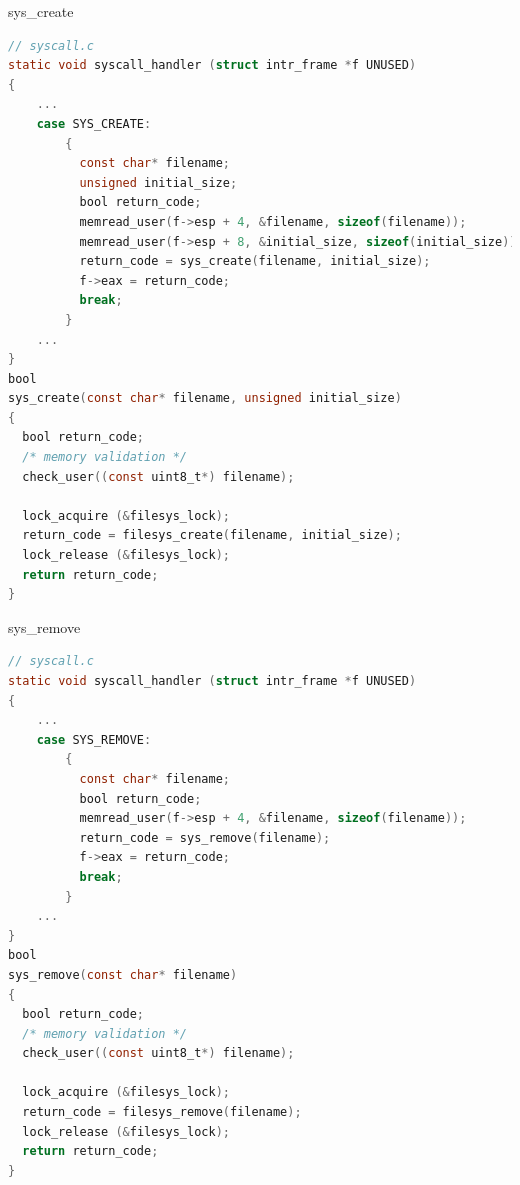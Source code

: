 \documentclass[10pt]{beamer}
\begin{document}
\begin{frame}[fragile]{sys\_create}
    \begin{lstlisting}[language=C]
// syscall.c
static void syscall_handler (struct intr_frame *f UNUSED) 
{
    ...
    case SYS_CREATE:
        {
          const char* filename;
          unsigned initial_size;
          bool return_code;
          memread_user(f->esp + 4, &filename, sizeof(filename));
          memread_user(f->esp + 8, &initial_size, sizeof(initial_size));
          return_code = sys_create(filename, initial_size);
          f->eax = return_code;
          break;
        }
    ...
}
bool 
sys_create(const char* filename, unsigned initial_size) 
{
  bool return_code;
  /* memory validation */
  check_user((const uint8_t*) filename);

  lock_acquire (&filesys_lock);
  return_code = filesys_create(filename, initial_size);
  lock_release (&filesys_lock);  
  return return_code;
}
    \end{lstlisting}
\end{frame}
\begin{frame}[fragile]{sys\_remove}
    \begin{lstlisting}[language=C]
// syscall.c
static void syscall_handler (struct intr_frame *f UNUSED) 
{
    ...
    case SYS_REMOVE:
        {
          const char* filename;
          bool return_code;
          memread_user(f->esp + 4, &filename, sizeof(filename));
          return_code = sys_remove(filename);
          f->eax = return_code;
          break;
        }
    ...
}
bool 
sys_remove(const char* filename) 
{
  bool return_code;
  /* memory validation */
  check_user((const uint8_t*) filename);

  lock_acquire (&filesys_lock);
  return_code = filesys_remove(filename);
  lock_release (&filesys_lock);
  return return_code;
}

    \end{lstlisting}
\end{frame}
\end{document}
